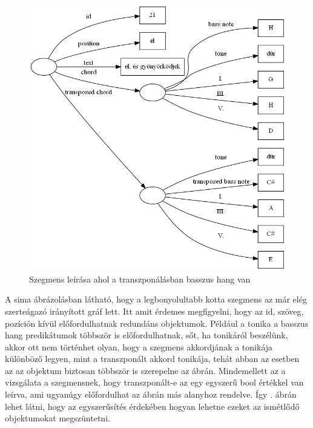 \begin{figure}[h]
	\centering
	\includegraphics[scale=0.5]{images/img_src/rdf_graph_6.png}
	\caption{Szegmens leírása ahol a transzponálásban basszus hang van}
	\label{fig:graph6}
\end{figure}

A sima ábrázolásban látható, hogy a legbonyolultabb kotta szegmens az már elég szerteágazó irányított gráf lett. Itt amit érdemes megfigyelni, hogy az id, szöveg, pozíción kívül előfordulhatnak redundáns objektumok. Például a tonika a basszus hang predikátumok többször is előfordulhatnak, sőt, ha tonikáról beszélünk, akkor ott nem történhet olyan, hogy a szegmens akkordjának a tonikája különböző legyen, mint a transzponált akkord tonikája, tehát abban az esetben az az objektum biztosan többször is szerepelne az ábrán. Mindemellett az a vizsgálata a szegmensnek, hogy transzponált-e az egy egyszerű bool értékkel van leírva, ami ugyanúgy előfordulhat az ábrán más alanyhoz rendelve. Így . ábrán lehet látni, hogy az egyszerűsítés érdekében hogyan lehetne ezeket az ismétlődő objektumokat megszüntetni.

